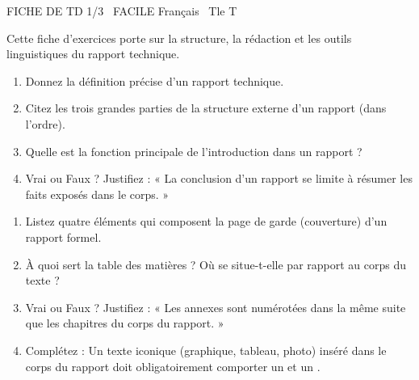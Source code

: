 \documentclass[11pt]{article}
\begin{document}
\begin{tcolorbox}[enhanced,colback=popink,colframe=popink,arc=10pt,boxrule=0pt,left=12pt,right=12pt,top=9pt,bottom=9pt]
{\color{white}\popxbold\small FICHE DE TD 1/3 \textbullet\ FACILE \hfill Français \textbullet\ Tle T\par}
\end{tcolorbox}
\vspace{4pt}
\noindent Cette fiche d'exercices porte sur la structure, la rédaction et les outils linguistiques du rapport technique.

\begin{exercice}
\begin{enumerate}
    \item Donnez la définition précise d'un rapport technique.
    \item Citez les trois grandes parties de la structure externe d'un rapport (dans l'ordre).
    \item Quelle est la fonction principale de l'introduction dans un rapport ?
    \item Vrai ou Faux ? Justifiez : « La conclusion d'un rapport se limite à résumer les faits exposés dans le corps. »
\end{enumerate}
\end{exercice}

\begin{exercice}
\begin{enumerate}
    \item Listez quatre éléments qui composent la page de garde (couverture) d'un rapport formel.
    \item À quoi sert la table des matières ? Où se situe-t-elle par rapport au corps du texte ?
    \item Vrai ou Faux ? Justifiez : « Les annexes sont numérotées dans la même suite que les chapitres du corps du rapport. »
    \item Complétez : Un texte iconique (graphique, tableau, photo) inséré dans le corps du rapport doit obligatoirement comporter un \underline{\hspace{4cm}} et un \underline{\hspace{4cm}}.
\end{enumerate}
\end{exercice}
\end{document}
